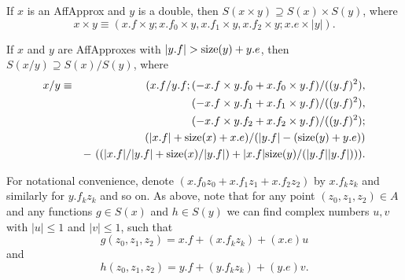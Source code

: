 If $x$ is an {\rm AffApprox}  and $y$ is a double{\rm ,} then $S(x \times y) \supseteq S(x) \times S(y)${\rm ,} where
$$ x \times y \equiv (x.f \times y;  x.f_0 \times y, 
x.f_1 \times y,  x.f_2 \times y; 
x.e \times |y|). $$
\endproclaim

 If $x$ and $y$ are {\rm AffApproxes}  with $|y.f| > {\rm size}(y) + y.e${\rm ,}
 then $S(x / y) \supseteq
S(x) / S(y)${\rm ,} where
\begin{eqnarray*}
x / y &\equiv& (x.f / y.f; (-x.f \times y.f_0 + x.f_0 \times y.f)/((y.f)^2),\\&&\qquad  
(-x.f \times y.f_1 + x.f_1 \times y.f)/((y.f)^2), 
\\
&&\qquad 
(-x.f \times y.f_2 + x.f_2 \times y.f)/((y.f)^2); 
\\
&&\qquad (|x.f| + {\rm size}(x) + x.e) /(|y.f| - ({\rm size}(y) + y.e))\\
&&  - \
((|x.f|/|y.f| + {\rm size}(x)/|y.f|) + |x.f| {\rm size}(y)/(|y.f||y.f|))).
                                           \end{eqnarray*}
\endproclaim

For notational convenience, denote $(x.f_0 z_0 + x.f_1 z_1 + x.f_2 z_2)$ by $x.f_k z_k$ and similarly for $y.f_k z_k$ and so on.
As above, note that for any point $(z_0, z_1, z_2) \in A$ and any functions $g \in S(x)$ and $h \in S(y)$ we can find complex numbers $u, v$ with $|u| \le 1$ and $|v| \le 1$, such that
$$ g(z_0, z_1, z_2) = x.f + (x.f_k z_k) + (x.e) u$$ and 
$$ h(z_0, z_1, z_2) = y.f + (y.f_k z_k) + (y.e) v.$$ 

